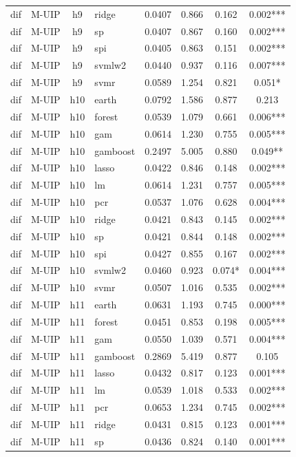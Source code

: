 \begin{ThreePartTable}
\begin{longtable}[t]{llclcccc}
dif & M-UIP & h9 & ridge & 0.0407 & 0.866 & 0.162 & 0.002***\\
dif & M-UIP & h9 & sp & 0.0407 & 0.867 & 0.160 & 0.002***\\
dif & M-UIP & h9 & spi & 0.0405 & 0.863 & 0.151 & 0.002***\\
dif & M-UIP & h9 & svmlw2 & 0.0440 & 0.937 & 0.116 & 0.007***\\
dif & M-UIP & h9 & svmr & 0.0589 & 1.254 & 0.821 & 0.051*\\
\addlinespace
dif & M-UIP & h10 & earth & 0.0792 & 1.586 & 0.877 & 0.213\\
dif & M-UIP & h10 & forest & 0.0539 & 1.079 & 0.661 & 0.006***\\
dif & M-UIP & h10 & gam & 0.0614 & 1.230 & 0.755 & 0.005***\\
dif & M-UIP & h10 & gamboost & 0.2497 & 5.005 & 0.880 & 0.049**\\
dif & M-UIP & h10 & lasso & 0.0422 & 0.846 & 0.148 & 0.002***\\
dif & M-UIP & h10 & lm & 0.0614 & 1.231 & 0.757 & 0.005***\\
dif & M-UIP & h10 & pcr & 0.0537 & 1.076 & 0.628 & 0.004***\\
dif & M-UIP & h10 & ridge & 0.0421 & 0.843 & 0.145 & 0.002***\\
dif & M-UIP & h10 & sp & 0.0421 & 0.844 & 0.148 & 0.002***\\
dif & M-UIP & h10 & spi & 0.0427 & 0.855 & 0.167 & 0.002***\\
dif & M-UIP & h10 & svmlw2 & 0.0460 & 0.923 & 0.074* & 0.004***\\
dif & M-UIP & h10 & svmr & 0.0507 & 1.016 & 0.535 & 0.002***\\
\addlinespace
dif & M-UIP & h11 & earth & 0.0631 & 1.193 & 0.745 & 0.000***\\
dif & M-UIP & h11 & forest & 0.0451 & 0.853 & 0.198 & 0.005***\\
dif & M-UIP & h11 & gam & 0.0550 & 1.039 & 0.571 & 0.004***\\
dif & M-UIP & h11 & gamboost & 0.2869 & 5.419 & 0.877 & 0.105\\
dif & M-UIP & h11 & lasso & 0.0432 & 0.817 & 0.123 & 0.001***\\
dif & M-UIP & h11 & lm & 0.0539 & 1.018 & 0.533 & 0.002***\\
dif & M-UIP & h11 & pcr & 0.0653 & 1.234 & 0.745 & 0.002***\\
dif & M-UIP & h11 & ridge & 0.0431 & 0.815 & 0.123 & 0.001***\\
dif & M-UIP & h11 & sp & 0.0436 & 0.824 & 0.140 & 0.001***\\

\end{longtable}
\end{ThreePartTable}
